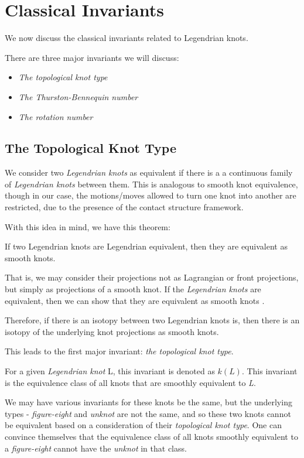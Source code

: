 \documentclass{article}
\begin{document}
\section{Classical Invariants}
We now discuss the classical invariants related to Legendrian knots.

There are three major invariants we will discuss:
\begin{itemize}
    \item \textit{The topological knot type}
    \item \textit{The Thurston-Bennequin number}
    \item \textit{The rotation number}
\end{itemize}

\subsection{The Topological Knot Type}
We consider two \textit{Legendrian knots} as equivalent
if there is a a continuous family of \textit{Legendrian knots} between
them. This is analogous to smooth knot equivalence, though in our case,
the motions/moves allowed to turn one knot into another are restricted,
due to the presence of the contact structure framework.

With this idea in mind, we have this theorem:
\begin{theorem}
    If two Legendrian knots are Legendrian equivalent, then they are
    equivalent as smooth knots.
\end{theorem}

That is, we may consider their projections not as Lagrangian or front
projections, but simply as projections of a smooth knot. If the \textit{Legendrian knots}
are equivalent, then we can show that they are equivalent as smooth knots \cite{etnyre}.

Therefore, if there is an 
isotopy between two Legendrian knots is, then there is an isotopy of the underlying knot
projections as smooth knots.

This leads to the first major invariant: \textit{the topological knot type}.

For a given \textit{Legendrian knot} L, this invariant is denoted as $k(L)$.
This invariant is the equivalence class of all knots that are smoothly equivalent
to \textit{L}.

We may have various invariants for these
knots be the same, but the underlying types - \textit{figure-eight} and \textit{unknot}
are not the same, and so these two knots cannot be equivalent based on a consideration
of their \textit{topological knot type}. One can convince themselves that
the equivalence class of all knots smoothly equivalent to a \textit{figure-eight}
cannot have the \textit{unknot} in that class.
\end{document}
